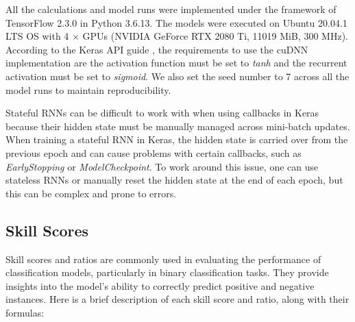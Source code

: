 All the calculations and model runs were implemented under the framework of TensorFlow 2.3.0 \citep{singh_2020} in Python 3.6.13. 
The models were executed on Ubuntu 20.04.1 LTS OS with 4 × GPUs (NVIDIA GeForce RTX 2080 Ti, 11019 MiB, 300 MHz).
According to the Keras API guide \citep{keras_2017}, the requirements to use the cuDNN implementation are the activation function must be set to \textit{tanh} and the recurrent activation must be set to \textit{sigmoid}.
We also set the seed number to 7 across all the model runs to maintain reproducibility.

Stateful RNNs can be difficult to work with when using callbacks in Keras because their hidden state must be manually managed across mini-batch updates. When training a stateful RNN in Keras, the hidden state is carried over from the previous epoch and can cause problems with certain callbacks, such as \textit{EarlyStopping} or \textit{ModelCheckpoint}. To work around this issue, one can use stateless RNNs or manually reset the hidden state at the end of each epoch, but this can be complex and prone to errors.

\subsection{Skill Scores}
\label{skillscores_appendix}
Skill scores and ratios are commonly used in evaluating the performance of classification models, particularly in binary classification tasks. They provide insights into the model's ability to correctly predict positive and negative instances. Here is a brief description of each skill score and ratio, along with their formulas:

